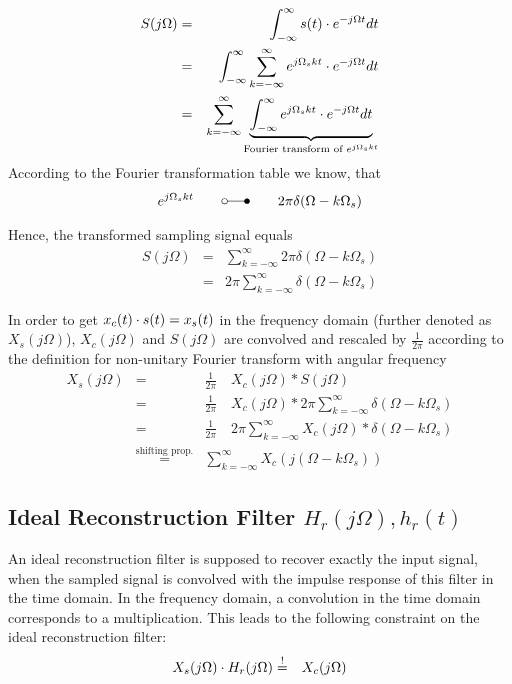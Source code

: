 \begin{eqnarray*}
S(j\Omega) & = & \int_{-\infty}^{\infty} s(t) \cdot e^{-j \Omega t} dt \\
 & = & \int_{-\infty}^{\infty} \sum_{k=-\infty}^{\infty} e^{j \Omega_s k t} \cdot e^{-j \Omega t} dt \\
 & = & \sum_{k=-\infty}^{\infty}  \underbrace{\int_{-\infty}^{\infty} e^{j \Omega_s k t} \cdot e^{-j \Omega t} dt}_{\text{Fourier transform of }e^{j \Omega_s k t}}
\end{eqnarray*}
According to the Fourier transformation table we know, that
\begin{eqnarray*}
e^{j \Omega_s k t} \qquad \laplace \qquad 2\pi \delta(\Omega - k\Omega_s)
\end{eqnarray*}

Hence, the transformed sampling signal equals
\begin{eqnarray*}
S(j\Omega) & = & \sum_{k=-\infty}^{\infty} 2\pi \delta(\Omega - k\Omega_s) \\
& = & 2\pi \sum_{k=-\infty}^{\infty} \delta(\Omega - k\Omega_s)
\end{eqnarray*}

In order to get $x_c(t) \cdot s(t) = x_s(t)$ in the frequency domain (further denoted as $X_s(j\Omega)$), $X_c(j\Omega)$ and $S(j\Omega)$ are convolved and rescaled by $\frac{1}{2\pi}$ according to the definition for non-unitary Fourier transform with angular frequency
\begin{eqnarray*}
X_s(j\Omega) & = & \frac{1}{2\pi} \quad X_c(j\Omega) \ast S(j\Omega) \\
 & = & \frac{1}{2\pi} \quad X_c(j\Omega) \ast 2\pi \sum_{k=-\infty}^{\infty} \delta(\Omega - k\Omega_s) \\
 & = & \frac{1}{2\pi} \quad 2\pi \sum_{k=-\infty}^{\infty} X_c(j\Omega) \ast \delta(\Omega - k\Omega_s) \\
 & \overset{\text{shifting prop.}}{=} & \sum_{k=-\infty}^{\infty} X_c(j(\Omega-k\Omega_s) )
\end{eqnarray*}

\subsection{Ideal Reconstruction Filter $H_r(j\Omega), h_r(t)$}

An ideal reconstruction filter is supposed to recover exactly the input signal, when the sampled signal is convolved with the impulse response of this filter in the time domain. In the frequency domain, a convolution in the time domain corresponds to a multiplication. This leads to the following constraint on the ideal reconstruction filter:
\begin{eqnarray*}
X_s(j\Omega) \cdot H_r(j\Omega) & \overset{!}{=} & X_c(j\Omega)
\end{eqnarray*}

